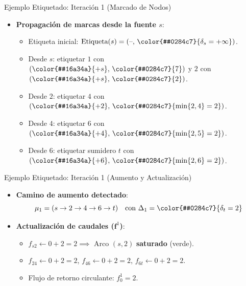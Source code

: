 \documentclass[
  ignorenonframetext,
]{beamer}
\providecommand{\tightlist}{%
  \setlength{\itemsep}{0pt}\setlength{\parskip}{0pt}}
\begin{document}
\begin{frame}{Ejemplo Etiquetado: Iteración 1 (Marcado de Nodos)}
\label{ejemplo-etiquetado-iteraciuxf3n-1-marcado-de-nodos}
\begin{itemize}
\tightlist
\item
  \textbf{Propagación de marcas desde la fuente \(s\)}:

  \begin{itemize}
  \tightlist
  \item
    Etiqueta inicial:
    \(\text{Etiqueta}(s) = (\text{–}, \, \color{#0284c7}{\delta_s = +\infty})\).
  \item
    Desde \(s\): etiquetar \(1\) con
    \((\color{#16a34a}{+s}, \, \color{#0284c7}{7})\) y \(2\) con
    \((\color{#16a34a}{+s}, \, \color{#0284c7}{2})\).
  \item
    Desde \(2\): etiquetar \(4\) con
    \((\color{#16a34a}{+2}, \, \color{#0284c7}{\min\{2, 4\} = 2})\).
  \item
    Desde \(4\): etiquetar \(6\) con
    \((\color{#16a34a}{+4}, \, \color{#0284c7}{\min\{2, 5\} = 2})\).
  \item
    Desde \(6\): etiquetar sumidero \(t\) con
    \((\color{#16a34a}{+6}, \, \color{#0284c7}{\min\{2, 6\} = 2})\).
  \end{itemize}
\end{itemize}
\end{frame}

\begin{frame}{Ejemplo Etiquetado: Iteración 1 (Aumento y Actualización)}
\label{ejemplo-etiquetado-iteraciuxf3n-1-aumento-y-actualizaciuxf3n}
\begin{itemize}
\item
  \textbf{Camino de aumento detectado}:
  \[\mu_1 = (s \to 2 \to 4 \to 6 \to t) \quad \text{con } \Delta_1 = \color{#0284c7}{\delta_t = 2}\]
\item
  \textbf{Actualización de caudales (\(\mathbf{f}^1\))}:

  \begin{itemize}
  \tightlist
  \item
    \(f_{s2} \leftarrow 0 + 2 = 2 \implies\) Arco \((s,2)\)
    \textbf{saturado} (verde).
  \item
    \(f_{24} \leftarrow 0 + 2 = 2\), \(f_{46} \leftarrow 0 + 2 = 2\),
    \(f_{6t} \leftarrow 0 + 2 = 2\).
  \item
    Flujo de retorno circulante: \(f_0^1 = 2\).
  \end{itemize}
\end{itemize}
\end{frame}
\end{document}
